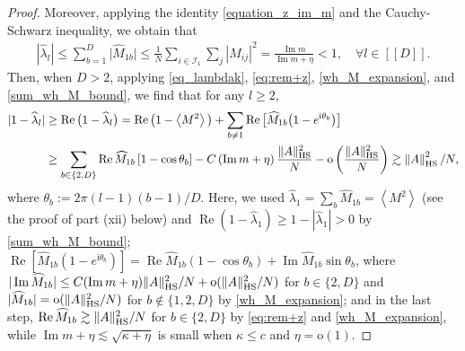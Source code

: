 \documentclass[10pt,reqno]{amsart}
\numberwithin{equation}{section}
\numberwithin{figure}{section}
\theoremstyle{plain} %
\theoremstyle{definition} %
\newcommand{\wh}{\widehat}
\renewcommand{\txt}[1]{\text{\rm{#1}}}
\newcommand{\cI}{\mathcal{I}}
\newcommand{\ii}{\mathrm{i}}
\renewcommand{\geq}{\ge}
\newcommand{\qq}[1]{[\![{#1}]\!]}
\newcommand{\pa}[1]{\left({#1}\right)}
\newcommand{\abs}[1]{\lvert #1 \rvert}
\newcommand{\absa}[1]{\left\lvert #1 \right\rvert}
\newcommand{\norma}[1]{\left\lVert #1 \right\rVert}
\newcommand{\avga}[1]{\left\langle #1 \right\rangle}
\DeclareMathOperator{\re}{\mathrm{Re}}
\DeclareMathOperator{\im}{\mathrm{Im}}
\newcommand{\oo}{\mathrm{o}}
\newcommand{\HS}{\txt{HS}}
\numberwithin{equation}{section}
\begin{document}
\begin{proof}
Moreover, applying the identity \eqref{equation_z_im_m} and the Cauchy-Schwarz inequality, we obtain that 
    \begin{equation}\label{sum_wh_M_bound}
        \begin{aligned}
|\wh\lambda_l|\le \sum_{b=1}^D\abs{\wh M_{1b}}\le \frac{1}{N}\sum_{i\in \cI_1}\sum_{j}\absa{M_{ij}}^2=\frac{\im m}{\im m+\eta}<1,\quad \forall   l \in \qq{D}.
        \end{aligned}
    \end{equation}    
Then, when $D>2$, applying \eqref{eq_lambdak}, \eqref{eq:rem+z},  \eqref{wh_M_expansion}, and \eqref{sum_wh_M_bound}, we find that for any $l\ge 2$,
    \begin{equation}\label{eq:whlambdal}
        \begin{aligned}
            \abs{1-\wh \lambda_l}&\geq \re\big(1-\wh \lambda_l\big)=\re\big(1-\avga{M^2}\big)+\sum_{b\ne 1}\re\big[\wh M_{1b}\big(1-e^{\ii\theta_b}\big)\big]\\
            &\geq \sum_{b\in\{2,D\}}\operatorname{Re} \widehat{M}_{1 b}\left[1-\cos \theta_b\right]-C\pa{\im m+\eta}\frac{\|A\|_{\HS}^2}{N}-\oo\left(\frac{\|A\|_{\HS}^2} {N}\right)
            \gtrsim \norma{A}_{\HS}^2/N,
        \end{aligned}
    \end{equation}
    where $\theta_b:=2 \pi(l-1)(b-1) / D$. Here, we used $\wh\lambda_1=\sum_b\wh M_{1b}=\avga{M^2}$ (see the proof of part (xii) below) and $\re(1-\wh\lambda_1)\ge 1-|\wh\lambda_1|>0$ by \eqref{sum_wh_M_bound}; $\re[\wh M_{1b}(1-e^{\ii\theta_b})]=\re\wh M_{1b}(1-\cos\theta_b)+\im \wh M_{1b}\sin\theta_b$, where $|\im\wh M_{1b}|\le C(\im m+\eta)\|A\|_{\HS}^2/N+\oo(\|A\|_{\HS}^2/N)$ for $b\in\{2,D\}$ and $|\wh M_{1b}|=\oo(\|A\|_{\HS}^2/N)$ for $b\notin\{1,2,D\}$ by \eqref{wh_M_expansion}; and in the last step, $\re\wh M_{1b}\gtrsim\|A\|_{\HS}^2/N$ for $b\in\{2,D\}$ by \eqref{eq:rem+z} and \eqref{wh_M_expansion}, while $\im m+\eta\lesssim\sqrt{\kappa+\eta}$ is small when $\kappa\le c$ and $\eta=\oo(1)$.

\end{proof}
\end{document}
